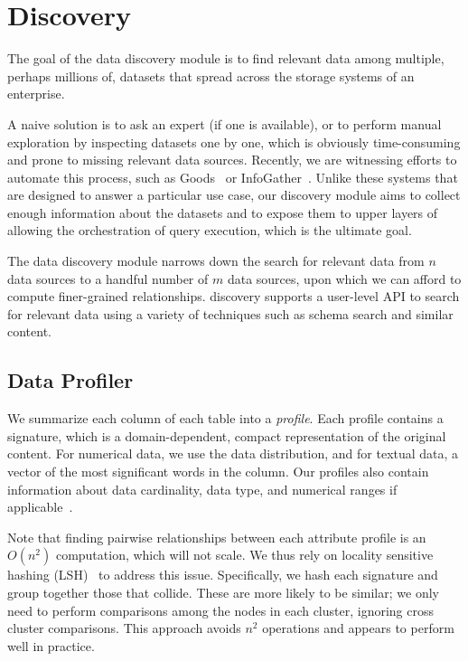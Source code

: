 \section{Discovery}
\label{sec:discovery}

The goal of the data discovery module is to find relevant data among multiple,
perhaps millions of, datasets that spread across the storage systems of an
enterprise.

A naive solution is to ask an expert (if one is available), or to perform
manual exploration by inspecting datasets one by one, which is obviously
time-consuming and prone to missing relevant data sources.  Recently, we are
witnessing efforts to automate this process, such as
Goods~\cite{DBLP:conf/sigmod/HalevyKNOPRW16} or
InfoGather~\cite{DBLP:conf/sigmod/YakoutGCC12}. Unlike these systems
that are designed to answer a particular use case, our discovery module aims to
collect enough information about the datasets and to expose them to upper layers
of \dcv allowing the orchestration of query execution, which is the ultimate
goal.

The data discovery module narrows down the search for relevant data from
$n$ data sources to a handful number of $m$ data sources, upon which we can afford to compute finer-grained relationships.
\dcv discovery supports a user-level API to search for relevant data using a
variety of techniques such as schema search and similar content. 

\subsection{Data Profiler}

We summarize each column of each table into a {\em profile}. Each profile contains a signature, which is a domain-dependent,
compact representation of the original content.  For numerical data, we use the
data distribution, and for textual data,  a vector of the most significant words
in the column.  Our profiles also contain information about data cardinality,
data type, and numerical ranges if applicable~\cite{profiling_survey}.

Note that finding pairwise relationships between each attribute profile is an $O(n^2)$ computation, which will not scale.  
We thus rely on locality sensitive hashing
(LSH)~\cite{DBLP:conf/compgeom/DatarIIM04} to address this issue. Specifically,
we hash each signature and group together those that collide.  These are more
likely to be similar; we only need to perform comparisons among the nodes in
each cluster, ignoring cross cluster comparisons.  This approach avoids $n^2$
operations and appears to perform well in practice.

